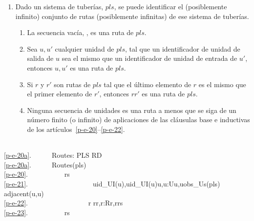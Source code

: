 \LLLL

\begin{enumerate}\setei
\item \label{p-e-20a}   Dado un sistema de tuberías, $pls$, se puede identificar el
                  (posiblemente infinito) conjunto de rutas (posiblemente infinitas)
                  de ese sistema de tuberías.
\begin{enumerate}
\item \label{p-e-20}  La secuencia vacía, {\LANGLE}{\RANGLE}, es una
                      ruta de $pls$.  
\item \label{p-e-21}  Sea $u, u'$ cualquier unidad de $pls$, tal que
                      un identificador de unidad de salida de $u$ sea el mismo que
                      un identificador de unidad de entrada de $u'$, entonces
                      {\LANGLE}$u,u'${\RANGLE} es una ruta de $pls$.
\item \label{p-e-22}  Si $r$ y $r'$ son rutas de $pls$ tal que
                      el último elemento de $r$ es el mismo que el primer
                      elemento de $r'$, entonces $r${\CONCAT}$r'$ es
                      una ruta de $pls$.  
\item \label{p-e-23}  Ninguna secuencia de unidades es una ruta a menos que
                      se siga de un número finito (o infinito) de
                      aplicaciones de las cláusulas base e inductivas
                      de los artículos~\ref{p-e-20}--\ref{p-e-22}.
\end{enumerate}
\savei\end{enumerate}

\mnewfoil\LLLL\HHHH

\bp
\>\ \\
\ref{p-e-20a}.\ \ \ \ \ \ Routes: PLS {\RIGHTARROW} RD\\
\ref{p-e-20a}.\ \ \ \ \ \ Routes(pls) {\IS} \\
\ref{p-e-20}.\ \ \ \ \ \ \ \ \ \  rs {\EQ} {\LANGLE}{\RANGLE} {\UNION} \\
\ref{p-e-21}.\ \ \ \ \ \ \ \ \ \ \ \ \ \ \ \ \ \ \ {\LBRACE}{\LANGLE}uid\_UI(u),uid\_UI(u{\PRIM}){\RANGLE}{\BAR}u,u{\PRIM}:U{\RDOT}{\LBRACE}u,u{\PRIM}{\RBRACE}{\SUBSETEQ}obs\_Us(pls) {\WEDGE} adjacent(u,u{\PRIM}){\RBRACE}\\
\ref{p-e-22}.\ \ \ \ \ \ \ \ \ \ \ \ \ \ \ \ \ {\UNION} {\LBRACE}r{\CONCAT} r{\PRIM}{\BAR}r,r{\PRIM}:R{\RDOT}{\LBRACE}r,r{\PRIM}{\RBRACE}{\SUBSETEQ}rs{\RBRACE}\\
\ref{p-e-23}.\ \ \ \ \ \ \ \ \ \  rs 
\ep

